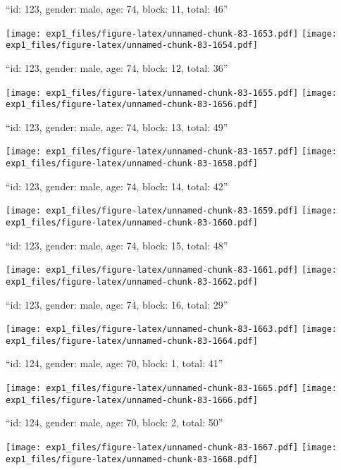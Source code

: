 \documentclass[11pt,,]{article}
\begin{document}
\newpage
[1] 

``id: 123, gender: male, age: 74, block: 11, total: 46''

\texttt{[image: exp1\_files/figure-latex/unnamed-chunk-83-1653.pdf]}
\texttt{[image: exp1\_files/figure-latex/unnamed-chunk-83-1654.pdf]}

\newpage
[1] 

``id: 123, gender: male, age: 74, block: 12, total: 36''

\texttt{[image: exp1\_files/figure-latex/unnamed-chunk-83-1655.pdf]}
\texttt{[image: exp1\_files/figure-latex/unnamed-chunk-83-1656.pdf]}

\newpage
[1] 

``id: 123, gender: male, age: 74, block: 13, total: 49''

\texttt{[image: exp1\_files/figure-latex/unnamed-chunk-83-1657.pdf]}
\texttt{[image: exp1\_files/figure-latex/unnamed-chunk-83-1658.pdf]}

\newpage
[1] 

``id: 123, gender: male, age: 74, block: 14, total: 42''

\texttt{[image: exp1\_files/figure-latex/unnamed-chunk-83-1659.pdf]}
\texttt{[image: exp1\_files/figure-latex/unnamed-chunk-83-1660.pdf]}

\newpage
[1] 

``id: 123, gender: male, age: 74, block: 15, total: 48''

\texttt{[image: exp1\_files/figure-latex/unnamed-chunk-83-1661.pdf]}
\texttt{[image: exp1\_files/figure-latex/unnamed-chunk-83-1662.pdf]}

\newpage
[1] 

``id: 123, gender: male, age: 74, block: 16, total: 29''

\texttt{[image: exp1\_files/figure-latex/unnamed-chunk-83-1663.pdf]}
\texttt{[image: exp1\_files/figure-latex/unnamed-chunk-83-1664.pdf]}

\newpage
[1] 

``id: 124, gender: male, age: 70, block: 1, total: 41''

\texttt{[image: exp1\_files/figure-latex/unnamed-chunk-83-1665.pdf]}
\texttt{[image: exp1\_files/figure-latex/unnamed-chunk-83-1666.pdf]}

\newpage
[1] 

``id: 124, gender: male, age: 70, block: 2, total: 50''

\texttt{[image: exp1\_files/figure-latex/unnamed-chunk-83-1667.pdf]}
\texttt{[image: exp1\_files/figure-latex/unnamed-chunk-83-1668.pdf]}
\end{document}
